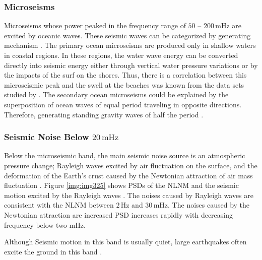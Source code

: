 \subsubsection{Microseisms}
Microseisms whose power peaked in the frequency range of $50$ -- $200\,\mathrm{mHz}$ are excited by oceanic waves. These seismic waves can be categorized by generating mechanism \cite{Bormann2012new}. The primary ocean microseisms are produced only in shallow waters in coastal regions. In these regions, the water wave energy can be converted directly into seismic energy either through vertical water pressure variations or by the impacts of the surf on the shores. Thus, there is a correlation between this microseismic peak and the swell at the beaches was known from the data sets studied by \cite{haubrich1963comparative}. The secondary ocean microseisms could be explained by the superposition of ocean waves of equal period traveling in opposite directions. Therefore, generating standing gravity waves of half the period \cite{longuet1950theory}.


\subsubsection{Seismic Noise Below $20\,\mathrm{mHz}$}
Below the microseismic band, the main seismic noise source is an atmospheric pressure change; Rayleigh waves excited by air fluctuation on the surface, and the deformation of the Earth's crust caused by the Newtonian attraction of air mass fluctuation \cite{sorrells1971earth,zurn1995noise}. Figure \ref{img:img325} shows PSDs of the NLNM and the seismic motion excited by the Rayleigh waves \cite{nishida2002origin}. The noises caused by Rayleigh waves are consistent with the NLNM between $2\,\mathrm{Hz}$ and $30\,\mathrm{mHz}$. The noises caused by the Newtonian attraction are increased PSD increases rapidly with decreasing frequency below two mHz.

Although Seismic motion in this band is usually quiet, large earthquakes often excite the ground in this band \cite{aki2002quantitative,aki1967scaling}.



